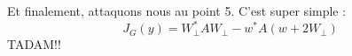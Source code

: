 Et finalement, attaquons nous au point 5. C'est super simple : 
$$J_G(y) = W^*_{\bot}AW_{\bot} - w^*A(w + 2W_{\bot}) $$
TADAM!! 

















 